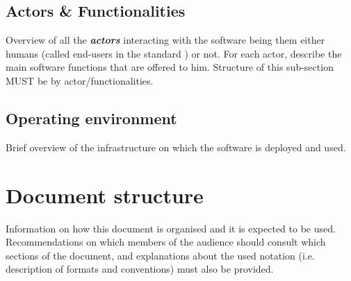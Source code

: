 \subsection{Actors \& Functionalities}
Overview of all the \textbf{\emph{\glspl{actor}}} interacting with the software
being them either humans (called end-users in the standard
\cite{IEEE-2001-userdocumentation}) or not. For each actor, describe the main
software functions that are offered to him. Structure of this sub-section MUST
be by actor/functionalities.


\subsection{Operating environment}
Brief overview of the infrastructure on which the software is deployed and used.

\section{Document structure}  
Information on how this document is organised and it is expected to be
used. Recommendations on which members of the audience
should consult which sections of the document, and explanations about the used
notation (i.e. description of formats and conventions) must also be provided.





